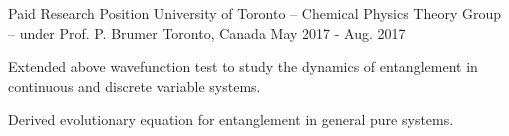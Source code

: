 \begin{cventries}
  \cventry
    {Paid Research Position} %
    {University of Toronto -- Chemical Physics Theory Group -- under Prof. P. Brumer} %
    {Toronto, Canada} %
    {May 2017 - Aug. 2017} %
    {
      \begin{cvitems} %
        \item{Extended above wavefunction test to study the dynamics of entanglement
            in continuous and discrete variable systems.}
        \item{Derived evolutionary equation for entanglement in general pure systems.}
      \end{cvitems}
    }

\end{cventries}

